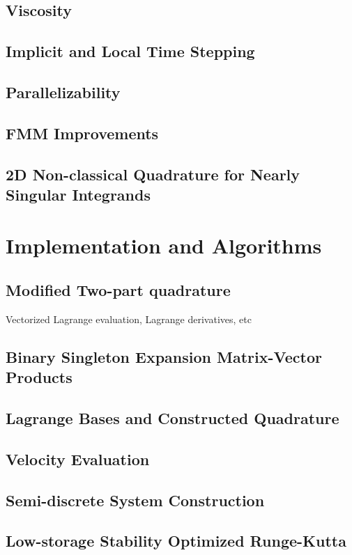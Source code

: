 \documentclass[letterpaper,12pt]{report}
\begin{document}
\section{Viscosity}
\newpage
\section{Implicit and Local Time Stepping}
\section{Parallelizability}
\section{FMM Improvements}
\section{2D Non-classical Quadrature for Nearly Singular Integrands}
\chapter{Implementation and Algorithms}
\section{Modified Two-part quadrature}
Vectorized Lagrange evaluation, Lagrange derivatives, etc
\newpage
\section{Binary Singleton Expansion Matrix-Vector Products}
\section{Lagrange Bases and Constructed Quadrature}
\newpage
\section{Velocity Evaluation}
\section{Semi-discrete System Construction}
\newpage
\section{Low-storage Stability Optimized Runge-Kutta}
\end{document}

